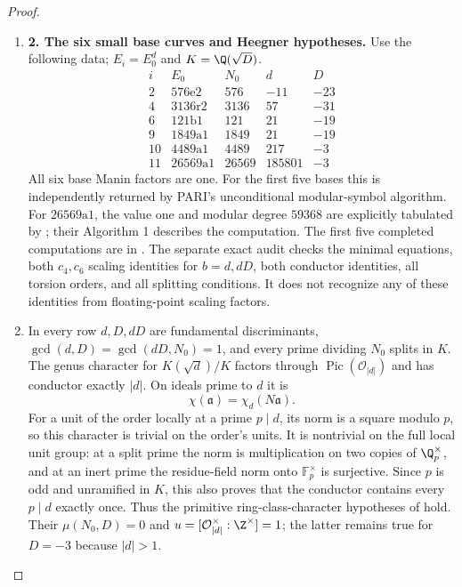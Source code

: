 \begin{proof}
\begin{enumerate}[label=\arabic*.,leftmargin=*]
\item \textbf{2. The six small base curves and Heegner hypotheses.}
Use the following data; $E_i=E_0^d$ and $K=\Q(\sqrt D)$.
\[
\begin{array}{c|c|r|r|r}
 i&E_0&N_0&d&D\\\hline
 2&576\mathrm e2&576&-11&-23\\
 4&3136\mathrm r2&3136&57&-31\\
 6&121\mathrm b1&121&21&-19\\
 9&1849\mathrm a1&1849&21&-19\\
 10&4489\mathrm a1&4489&217&-3\\
 11&26569\mathrm a1&26569&185801&-3
\end{array}
\]
All six base Manin factors are one. For the first five bases this
is independently returned by PARI's unconditional modular-symbol
algorithm. For $26569\mathrm a1$, the value one and modular degree
$59368$ are explicitly tabulated by
\citet[Appendix B, p.~102, unnumbered $26569\mathrm a1/26569\mathrm a2$
block]{CgzBelabas2019}; their Algorithm 1 describes the computation.
The first five completed computations are in
. The separate exact audit
 checks the minimal equations,
both $c_4,c_6$ scaling identities for $b=d,dD$, both conductor
identities, all torsion orders, and all splitting conditions. It
does not recognize any of these identities from floating-point
scaling factors.

\item In every row $d,D,dD$ are fundamental discriminants,
$\gcd(d,D)=\gcd(dD,N_0)=1$, and every prime dividing $N_0$ splits
in $K$. The genus character for $K(\sqrt d)/K$ factors through
$\operatorname{Pic}(\mathcal O_{|d|})$ and has conductor exactly
$|d|$. On ideals prime to $d$ it is
\[
 \chi(\mathfrak a)=\chi_d(N\mathfrak a).
\]
For a unit of the order locally at a prime $p\mid d$, its norm is
a square modulo $p$, so this character is trivial on the order's
units. It is nontrivial on the full local unit group: at a split
prime the norm is multiplication on two copies of $\Q_p^\times$,
and at an inert prime the residue-field norm onto $\mathbb F_p^\times$
is surjective. Since $p$ is odd and unramified in $K$, this also
proves that the conductor contains every $p\mid d$ exactly once.
Thus the primitive ring-class-character hypotheses of
\citet[Theorem 1.1, pp.~2524--2525]{CgzCai2014} hold. Their
$\mu(N_0,D)=0$ and
$u=[\mathcal O_{|d|}^{\times}:\Z^{\times}]=1$; the latter remains
true for $D=-3$ because $|d|>1$.


\end{enumerate}
\end{proof}
